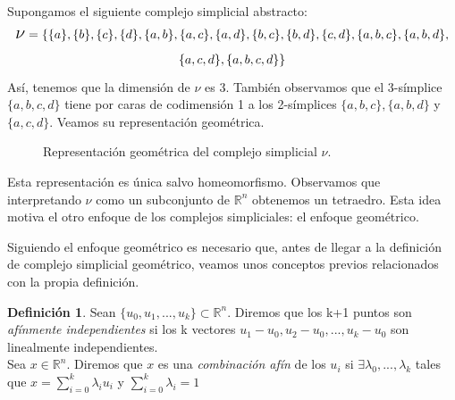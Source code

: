 \documentclass[12pt]{article}
\numberwithin{equation}{section}
\theoremstyle{definition}
\newtheorem{defi}{Definición}
\newenvironment{ejem}
  {\pushQED{\qed}\renewcommand{\qedsymbol}{$\blacktriangleleft$}\ejemplo}
  {\popQED\endejemplo}
\theoremstyle{remark}
\theoremstyle{plain}
\begin{document}
	\begin{ejem}
		Supongamos el siguiente complejo simplicial abstracto:
		\begin{multline*} 
			\text{{\Large $\nu$}}=\{\{a\},\{b\},\{c\},\{d\},
			\{a,b\},\{a,c\},\{a,d\},\{b,c\},\{b,d\},\{c,d\},
			\{a,b,c\},\{a,b,d\},\\
			\{a,c,d\},\{a,b,c,d\}\}
		\end{multline*}
		Así, tenemos que la dimensión de {\Large $\nu$} es 3. También 
		observamos que el 3-símplice $\{a,b,c,d\}$ tiene por caras de 
		codimensión 1 a los 2-símplices $\{a,b,c\},\{a,b,d\}$ y 
		$\{a,c,d\}$. Veamos su representación geométrica.

		\begin{figure}[H]
			\centering
			\caption{Representación geométrica del complejo 
			simplicial {\Large $\nu$}.}
		\end{figure}

		Esta representación es única salvo homeomorfismo. Observamos 
		que interpretando {\Large $\nu$} como un subconjunto de 
		$\mathbb{R}^{n}$ obtenemos un tetraedro. Esta idea motiva el 
		otro enfoque de los complejos simpliciales: el enfoque 
		geométrico.
	\end{ejem}

	Siguiendo el enfoque geométrico es necesario que, antes de llegar a la
	definición de complejo simplicial geométrico, veamos unos conceptos 
	previos relacionados con la propia definición.

	\begin{defi}
		Sean $\{u_{0},u_{1},...,u_{k}\}\subset\mathbb{R}^{n}$. Diremos
		que los k+1 puntos son \textit{afínmente independientes} si 
		los k vectores $u_{1}-u_{0},u_{2}-u_{0},...,u_{k}-u_{0}$ son
		linealmente independientes.\\
		Sea $x \in \mathbb{R}^{n}$. Diremos que $x$ es una 
		\textit{combinación afín} de los $u_{i}$ si $\exists 
		\lambda_{0},...,\lambda_{k}$ tales que 
		$x=\sum_{i=0}^{k}\lambda_{i}u_{i}$ y 
		$\sum_{i=0}^{k}\lambda_{i}=1$
	\end{defi}
\end{document}
